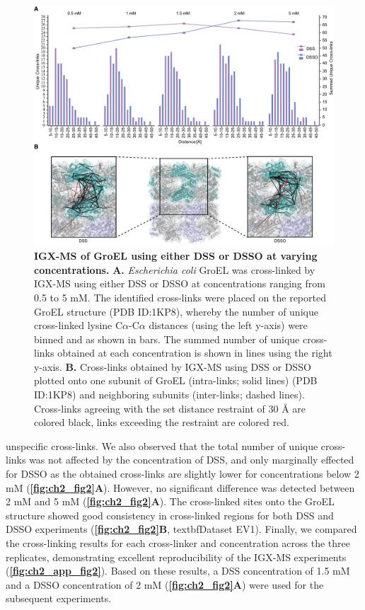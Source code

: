 \begin{figure}[hbt!]
\center
\includegraphics[width=\textwidth]{Chapter.2/Figures/Fig2.jpg} 
\caption{\textbf{IGX-MS of GroEL using either DSS or DSSO at varying concentrations.} \textbf{A.} \emph{Escherichia coli} GroEL was cross-linked by IGX-MS using either DSS or DSSO at concentrations ranging from 0.5 to 5 mM. The identified cross-links were placed on the reported GroEL structure (PDB ID:1KP8), whereby the number of unique cross-linked lysine C$\alpha$-C$\alpha$ distances (using the left y-axis) were binned and as shown in bars. The summed number of unique cross-links obtained at each concentration is shown in lines using the right y-axis. \textbf{B.} Cross-links obtained by IGX-MS using DSS or DSSO plotted onto one subunit of GroEL (intra-links; solid lines) (PDB ID:1KP8) and neighboring subunits (inter-links; dashed lines). Cross-links agreeing with the set distance restraint of 30 Å are colored black, links exceeding the restraint are colored red.}
\label{fig:ch2_fig2}
\end{figure}

unspecific cross-links. We also observed that the total number of unique cross-links was not affected by the concentration of DSS, and only marginally effected for DSSO as the obtained cross-links are slightly lower for concentrations below 2 mM (\textbf{\autoref{fig:ch2_fig2}A}). However, no significant difference was detected between 2 mM and 5 mM (\textbf{\autoref{fig:ch2_fig2}A}). The cross-linked sites onto the GroEL structure showed good consistency in cross-linked regions for both DSS and DSSO experiments (\textbf{\autoref{fig:ch2_fig2}B}, textbf{Dataset EV1}). Finally, we compared the cross-linking results for each cross-linker and concentration across the three replicates, demonstrating excellent reproducibility of the IGX-MS experiments (\textbf{\autoref{fig:ch2_app_fig2}}). Based on these results, a DSS concentration of 1.5 mM and a DSSO concentration of 2 mM (\textbf{\autoref{fig:ch2_fig2}A}) were used for the subsequent experiments.

